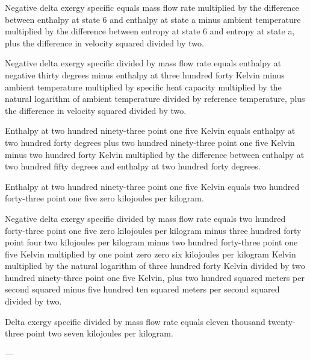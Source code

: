 Negative delta exergy specific equals mass flow rate multiplied by the difference between enthalpy at state 6 and enthalpy at state a minus ambient temperature multiplied by the difference between entropy at state 6 and entropy at state a, plus the difference in velocity squared divided by two.  

Negative delta exergy specific divided by mass flow rate equals enthalpy at negative thirty degrees minus enthalpy at three hundred forty Kelvin minus ambient temperature multiplied by specific heat capacity multiplied by the natural logarithm of ambient temperature divided by reference temperature, plus the difference in velocity squared divided by two.  

Enthalpy at two hundred ninety-three point one five Kelvin equals enthalpy at two hundred forty degrees plus two hundred ninety-three point one five Kelvin minus two hundred forty Kelvin multiplied by the difference between enthalpy at two hundred fifty degrees and enthalpy at two hundred forty degrees.  

Enthalpy at two hundred ninety-three point one five Kelvin equals two hundred forty-three point one five zero kilojoules per kilogram.  

Negative delta exergy specific divided by mass flow rate equals two hundred forty-three point one five zero kilojoules per kilogram minus three hundred forty point four two kilojoules per kilogram minus two hundred forty-three point one five Kelvin multiplied by one point zero zero six kilojoules per kilogram Kelvin multiplied by the natural logarithm of three hundred forty Kelvin divided by two hundred ninety-three point one five Kelvin, plus two hundred squared meters per second squared minus five hundred ten squared meters per second squared divided by two.  

Delta exergy specific divided by mass flow rate equals eleven thousand twenty-three point two seven kilojoules per kilogram.  

---